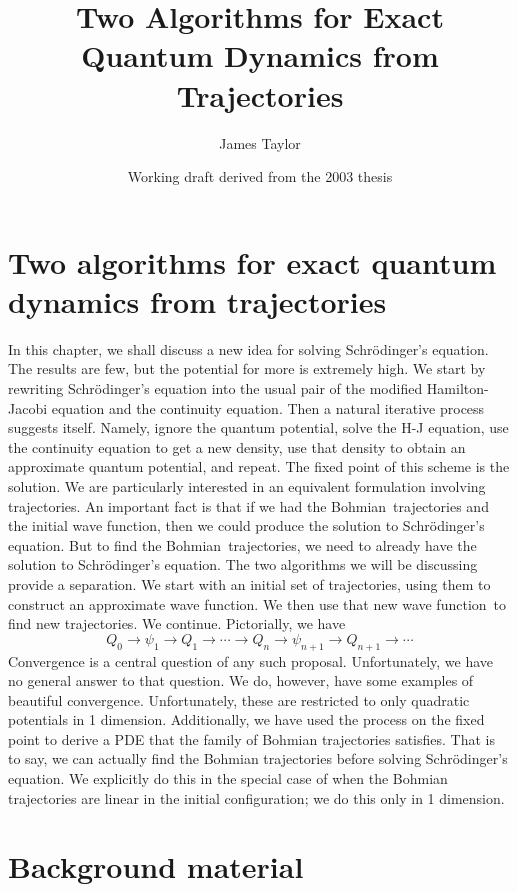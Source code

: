\documentclass[11pt]{article}
\title{Two Algorithms for Exact Quantum Dynamics from Trajectories}
\author{James Taylor}
\date{Working draft derived from the 2003 thesis}
\theoremstyle{remark}
\begin{document}
\maketitle

\section{Two 
algorithms for exact quantum dynamics from trajectories} \label{c:algo}


In this chapter, we shall discuss a new idea for 
solving Schr\"odinger's equation. The results are few, but the potential for more is
extremely high. 
We start by rewriting Schr\"odinger's equation into the usual pair of
the modified 
Hamilton-Jacobi equation and the continuity equation. Then a
natural iterative process suggests itself. Namely, ignore the quantum
potential, solve the H-J equation, use the continuity equation to get a new
density, use that density to obtain an approximate quantum potential, and
repeat. The fixed point of this scheme is the solution. We are
particularly interested in an equivalent 
formulation involving trajectories.
 An important fact is that if we had the Bohmian\
trajectories and the initial wave function, then we could produce the solution
to Schr\"odinger's equation. But to find the Bohmian\ trajectories,  we need to already have
the solution to Schr\"odinger's equation. The two
algorithms we will be discussing provide a separation. We start with
an initial set of trajectories, using them to construct an approximate
wave function. We then use that new wave function\ to find new trajectories. We
continue. Pictorially, we have 
\[
Q_0 \to \ensuremath{\psi}_1 \to Q_1 \to \cdots \to Q_n \to \ensuremath{\psi}_{n+1} \to Q_{n+1}
\to \cdots 
\]
Convergence is a central question of any such proposal. Unfortunately,
we have no general answer to that question. We do, however, have some examples
of beautiful convergence. Unfortunately, these are restricted to only
quadratic
potentials in 1 dimension. Additionally, we have used the process on
the fixed point to derive a PDE that the family of Bohmian
trajectories satisfies. That is to say, we can actually find the
Bohmian trajectories before solving Schr\"odinger's equation. We explicitly do this in the
special case of when the Bohmian trajectories are linear in the
initial configuration; we
do this only in 1 dimension. 

\section{Background material}
\end{document}
